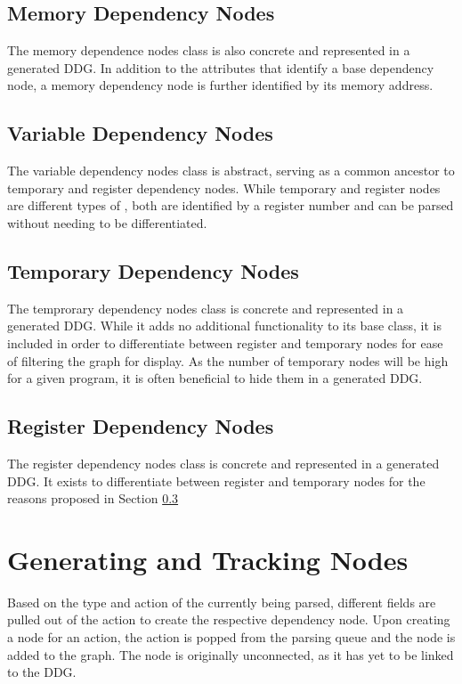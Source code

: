 \subsection{Memory Dependency Nodes}
The memory dependence nodes class is also concrete and represented in a generated DDG. In addition to the attributes that identify a base dependency node, a memory dependency node is further identified by its memory address. 

\subsection{Variable Dependency Nodes}
The variable dependency nodes class is abstract, serving as a common ancestor to temporary and register dependency nodes. While temporary and register nodes are different types of , both are identified by a register number and can be parsed without needing to be differentiated. 

\subsection{Temporary Dependency Nodes}
\label{section:tmp}
The temprorary dependency nodes class is concrete and represented in a generated DDG. While it adds no additional functionality to its base class, it is included in order to differentiate between register and temporary nodes for ease of filtering the graph for display. As the number of temporary nodes will be high for a given program, it is often beneficial to hide them in a generated DDG. 

\subsection{Register Dependency Nodes}
The register dependency nodes class is concrete and represented in a generated DDG. It exists to differentiate between register and temporary nodes for the reasons proposed in Section \ref{section:tmp}

\section{Generating and Tracking Nodes}
Based on the type and action of the  currently being parsed, different fields are pulled out of the action to create the respective dependency node. Upon creating a node for an action, the action is popped from the parsing queue and the node is added to the graph. The node is originally unconnected, as it has yet to be linked to the DDG.  


